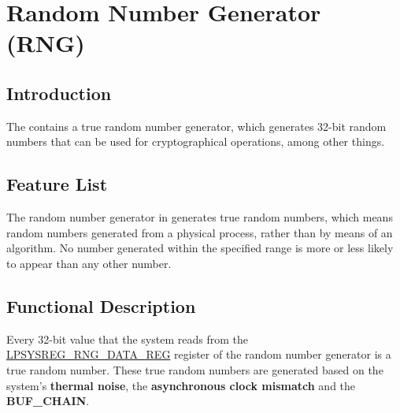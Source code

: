 \documentclass[main\_\_EN.tex]{subfiles}
\begin{document}

\ifglobal
\else
    {\let\clearpage\relax \listoftodos}
    {\let\clearpage\relax \listofdonetodos}
    \tableofcontents
\fi



\hypertarget{rng}{}
\chapter{Random Number Generator (RNG)}
\label{mod:rng}


\section{Introduction}

The \chipname{} contains a true random number generator, which generates 32-bit random numbers that can be used for cryptographical operations, among other things.


\section{Feature List}
\label{sec:rng-features}

The random number generator in \chipname{} generates true random numbers, which means random numbers generated from a physical process, rather than by means of an algorithm. No number generated within the specified range is more or less likely to appear than any other number.


\section{Functional Description}
\label{sec:rng-func-descr}

Every 32-bit value that the system reads from the \hyperref[regdesc:LPSYSREGRNGDATAREG]{LPSYSREG\_RNG\_DATA\_REG} register of the random number generator is a true random number. These true random numbers are generated based on the system’s \textbf{thermal noise}, the \textbf{asynchronous clock mismatch} and the \textbf{BUF\_CHAIN}.
\end{document}

